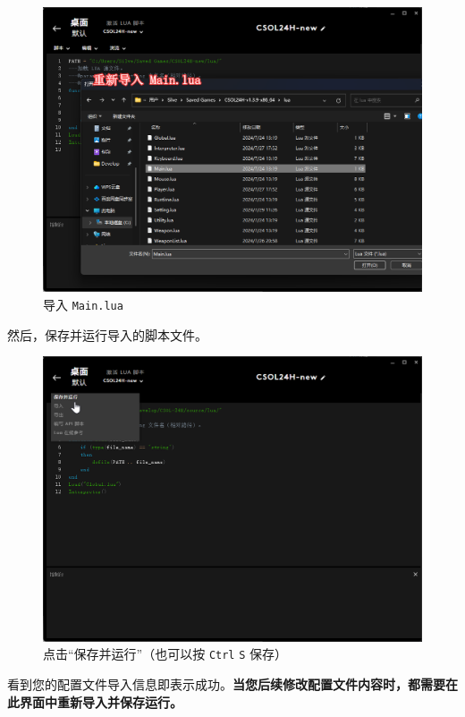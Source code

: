 \begin{figure}[H]
    \Centering
    \includegraphics[width=\textwidth]{docs/assets/update/import_main_01.png}
    \caption{导入 \lstinline{Main.lua}}
\end{figure}

然后，保存并运行导入的脚本文件。

\begin{figure}[H]
    \Centering
    \includegraphics[width=\textwidth]{docs/assets/update/save_and_run_00.png}
    \caption{点击“保存并运行”（也可以按 \lstinline{Ctrl} \lstinline{S} 保存）}
\end{figure}

看到您的配置文件导入信息即表示成功。\textbf{\color{red}当您后续修改配置文件内容时，都需要在此界面中重新导入并保存运行。}

